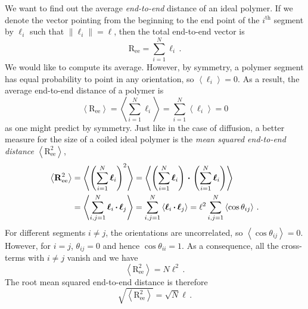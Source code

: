 \documentclass{article}
\theoremstyle{plain}\theoremheaderfont{\normalfont\bfseries}\theorembodyfont{\rmfamily}\theoremseparator{.}\newtheorem*{thm}{Theorem}\newtheorem*{law}{Law}\newtheorem*{pos}{Postulate}
\numberwithin{equation}{section}
\newcommand{\eval}[1]{\left\langle #1 \right\rangle}
\newcommand{\vb}[1]{\bm{\mathrm{#1}}}
\newcommand{\vdot}{\,\bm{\mathrm{\cdot}}\,}
\newcommand{\norm}[1]{\left\| #1 \right\|}
\begin{document}
    We want to find out the average \textit{end-to-end} distance of an ideal polymer. If we denote the vector pointing from the beginning to the end point of the \(i^{\text{th}}\) segment by \(\vb{\ell}_i\) such that \(\norm{\vb{\ell}_i}=\ell\), then the total end-to-end vector is
    \begin{equation}
        \vb{R}_{\text{ee}}=\sum_{i=1}^{N}\vb{\ell}_i\,.
    \end{equation}
    We would like to compute its average. However, by symmetry, a polymer segment has equal probability to point in any orientation, so \(\eval{\vb{\ell}_i}=\vb{0}\). As a result, the average end-to-end distance of a polymer is
    \begin{equation}
        \eval{\vb{R}_{\text{ee}}}=\eval{\sum_{i=1}^{N}\vb{\ell}_i}=\sum_{i=1}^{N}\eval{\vb{\ell}_i}=\vb{0}
    \end{equation}
    as one might predict by symmetry. Just like in the case of diffusion, a better measure for the size of a coiled ideal polymer is the \textit{mean squared end-to-end distance} \(\eval{\vb{R}_{\text{ee}}^2}\),
    \begin{align}
        \eval{\vb{R}_{\text{ee}}^2}&=\eval{\left(\sum_{i=1}^{N}\vb{\ell}_i\right)^2}=\eval{\left(\sum_{i=1}^{N}\vb{\ell}_i\right)\vdot\left(\sum_{i=1}^{N}\vb{\ell}_i\right)}\notag \\
        &=\eval{\sum_{i,j=1}^{N}\vb{\ell}_i\vdot\vb{\ell}_j}=\sum_{i,j=1}^{N}\eval{\vb{\ell}_i\vdot\vb{\ell}_j}=\ell^2\sum_{i,j=1}^{N}\eval{\cos\theta_{ij}}\,.
    \end{align}
    For different segments \(i\ne j\), the orientations are uncorrelated, so \(\eval{\cos\theta_{ij}}=0\). However, for \(i=j\), \(\theta_{ij}=0\) and hence \(\cos\theta_{ii}=1\). As a consequence, all the cross-terms with \(i\ne j\) vanish and we have
    \begin{equation}
        \eval{\vb{R}_{\text{ee}}^2}=N\ell^2\,.
    \end{equation}
    The root mean squared end-to-end distance is therefore
    \begin{equation}
        \sqrt{\eval{\vb{R}_{\text{ee}}^2}}=\sqrt{N}\ell\,.
    \end{equation}
\end{document}
